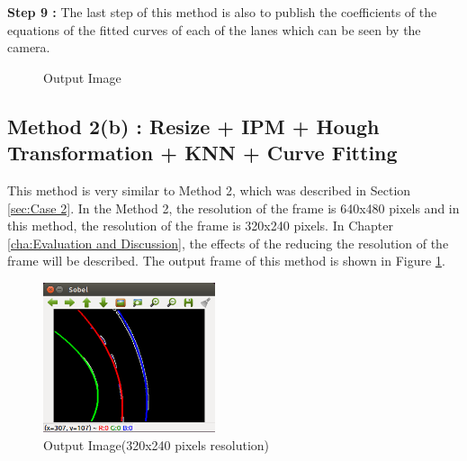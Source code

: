 \textbf{Step 9 : }The last step of this method is also to publish the coefficients of the equations of the fitted curves of each of the lanes which can be seen by the camera.


\begin{figure}[H]
  \centering
  \caption{Output Image}
\end{figure} 



\subsection{Method 2(b) : Resize + IPM + Hough Transformation + KNN + Curve Fitting}\label{sec:Case 5}

This method is very similar to Method 2, which was described in Section \ref{sec:Case 2}. In the Method 2, the resolution of the frame is 640x480 pixels and in this method, the resolution of the frame is 320x240 pixels. In Chapter \ref{cha:Evaluation and Discussion}, the effects of the reducing the resolution of the frame will be described. The output frame of this method is shown in Figure \ref{fig:Case5_OutputImage}.


\begin{figure}[H]
  \centering
  \includegraphics[width=0.45\textwidth]{./Bilder/Case5_OutputImage.png}
  \caption{Output Image(320x240 pixels resolution)}
  \label{fig:Case5_OutputImage}
\end{figure}




